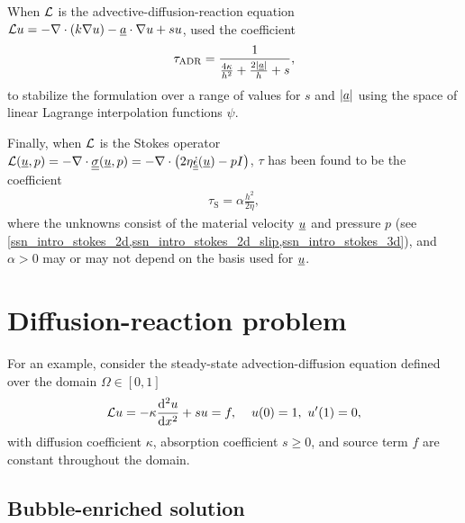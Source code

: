 When $\mathcal{L}$ is the advective-diffusion-reaction equation $\mathcal{L} u = - \nabla \cdot \left( k \nabla u \right) - \underline{a} \cdot \nabla u + s u$, \citet{codina_1992} used the coefficient
\begin{align}
  \label{tau_adr}
  \tau_{\text{ADR}} = \frac{1}{\frac{4 \kappa}{h^2} + \frac{2 |\underline{a}|}{h} + s},
\end{align}
to stabilize the formulation over a range of values for $s$ and $|\underline{a}|$ using the space of linear Lagrange interpolation functions $\psi$.

Finally, when $\mathcal{L}$ is the Stokes operator $\mathcal{L} (\underline{u},p) = -\nabla \cdot \underline{\underline{\sigma}}(\underline{u},p) = -\nabla \cdot \left( 2\eta\underline{\underline{\dot{\epsilon}}}(\underline{u}) - pI \right)$, $\tau$ has been found to be the coefficient \citep{hughes_1986}
\begin{align}
  \label{tau_stokes}
  \tau_{\text{S}} = \alpha \frac{h^2}{2\eta},
\end{align}
where the unknowns consist of the material velocity $\underline{u}$ and pressure $p$ (see \cref{ssn_intro_stokes_2d,ssn_intro_stokes_2d_slip,ssn_intro_stokes_3d}), and $\alpha > 0$ may or may not depend on the basis used for $\underline{u}$.




\section{Diffusion-reaction problem}

For an example, consider the steady-state advection-diffusion equation defined over the domain $\Omega \in [0,1]$
\begin{align}
  \label{bubble_example_1}
  \Lu u = - \kappa \totder[2]{u}{x} + s u = f, \hspace{4mm} u(0) = 1,\ u'(1) = 0,
\end{align}
with diffusion coefficient $\kappa$, absorption coefficient $s \geq 0$, and source term $f$ are constant throughout the domain.

\subsection{Bubble-enriched solution}

